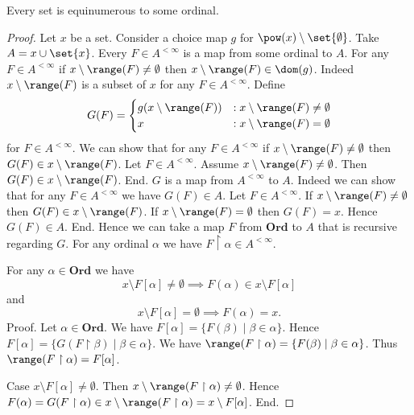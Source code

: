 \documentclass{article}
\newcommand\Ord{\textbf{Ord}}
\begin{document}
  \begin{forthel}
    \begin{theorem*}[title=Zermelo's Well-Ordering Theorem,id=zermelo]
      Every set is equinumerous to some ordinal.
    \end{theorem*}
    \begin{proof}
      Let $x$ be a set.
      Consider a choice map $g$ for $\pow(x) \setminus \set{\emptyset}$.
      Take $A = x \cup \set{x}$.
      Every $F \in A^{< \infty}$ is a map from some ordinal to $A$.
      For any $F \in A^{< \infty}$ if $x \setminus \range(F) \neq \emptyset$ then $x \setminus \range(F) \in \dom(g)$.
      Indeed $x \setminus \range(F)$ is a subset of $x$ for any $F \in A^{< \infty}$.
      Define \[ G(F) =
        \begin{cases}
          g(x \setminus \range(F))
          & : x \setminus \range(F) \neq \emptyset
          \\
          x
          & : x \setminus \range(F) = \emptyset
        \end{cases} \]
      for $F \in A^{< \infty}$.
      We can show that for any $F \in A^{< \infty}$ if $x \setminus \range(F) \neq \emptyset$ then $G(F) \in x \setminus \range(F)$.
        Let $F \in A^{< \infty}$.
        Assume $x \setminus \range(F) \neq \emptyset$.  
        Then $G(F) \in x \setminus \range(F)$.
      End.
      $G$ is a map from $A^{< \infty}$ to $A$.
      Indeed we can show that for any $F \in A^{< \infty}$ we have $G(F) \in A$.
        Let $F \in A^{< \infty}$.
        If $x \setminus \range(F) \neq \emptyset$ then $G(F) \in x \setminus \range(F)$.
        If $x \setminus \range(F) = \emptyset$ then $G(F) = x$.
        Hence $G(F) \in A$.
      End.
      Hence we can take a map $F$ from $\Ord$ to $A$ that is recursive regarding $G$.
      For any ordinal $\alpha$ we have $F \restriction \alpha \in A^{< \infty}$.

      For any $\alpha \in \Ord$ we have
      \[ x \setminus F[\alpha] \neq \emptyset \implies F(\alpha) \in x \setminus F[\alpha] \]
      and
      \[ x \setminus F[\alpha] = \emptyset \implies F(\alpha) = x. \]
      Proof.
        Let $\alpha \in \Ord$.
        We have $F[\alpha] = \{ F(\beta) \mid \beta \in \alpha \}$.
        Hence $F[\alpha] = \{ G(F \restriction \beta) \mid \beta \in \alpha \}$.
        We have $\range(F \restriction \alpha) = \{ F(\beta) \mid \beta \in \alpha \}$.
        Thus $\range(F \restriction \alpha) = F[\alpha]$.

        Case $x \setminus F[\alpha] \neq \emptyset$.
          Then $x \setminus \range(F \restriction \alpha) \neq \emptyset$.
          Hence $F(\alpha)
            = G(F \restriction \alpha)
            \in x \setminus \range(F \restriction \alpha)
            = x \setminus F[\alpha]$.
        End.


\end{proof}
\end{forthel}
\end{document}
